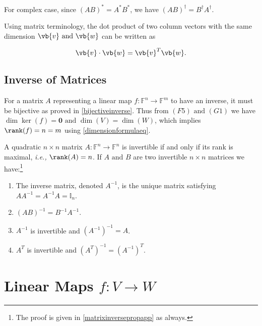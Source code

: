 \documentclass[a4paper,12pt]{report}
\begin{document}
For complex case, since \((AB)^* = A^*B^*\), we have \((AB)^{\dagger} = B^{\dagger} A^{\dagger}\). 

Using matrix terminology, the dot product of two column vectors with the same dimension \(\vb{v} \text { and } \vb{w} \) can be written as 

\begin{equation}
    \vb{v} \cdot \vb{w} = \vb{v} ^{T} \vb{w}.
\end{equation}

\subsection{Inverse of Matrices}

For a matrix \(A\) representing a linear map \(f:\mathbb{F}^{n} \rightarrow \mathbb{F}^{m} \) to have an inverse, it must be bijective as proved in \cref{bijectiveinverse}. Thus from \((F5) \text { and } (G1)\) we have \(\dim \ker (f) = \boldsymbol{0} \text { and } \dim (V) = \dim (W)\), which implies \(\rank (f) = n = m\) using \cref{dimensionformulaeq}.

\begin{lemma} \label{matrixinverseprop} 
A quadratic \(n \times n\) matrix \(A:\mathbb{F}^{n}\rightarrow \mathbb{F}^{n}  \) is invertible if and only if its rank is maximal, \textit{i.e.,} \(\rank (A) = n\). If \(A \text { and } B\) are two invertible \(n\times n\) matrices we have:\footnote{The proof is given in \cref{matrixinversepropapp} as always.} 

\begin{enumerate}[label=(\(H\)\arabic*)]
    \item The inverse matrix, denoted \(A^{-1} \), is the unique matrix satisfying \(AA^{-1} = A^{-1} A = \mathbb{I}_{n} \).
    \item \((AB)^{-1} = B^{-1} A^{-1} \).
    \item \(A^{-1} \) is invertible and \((A^{-1} )^{-1} = A\).
    \item \(A^{T} \) is invertible and \((A^{T} ) ^{-1} = (A^{-1} )^{T} \).   
\end{enumerate}

\end{lemma}

\section{Linear Maps \(f: V \rightarrow W\)} \label{relations} 
\end{document}
